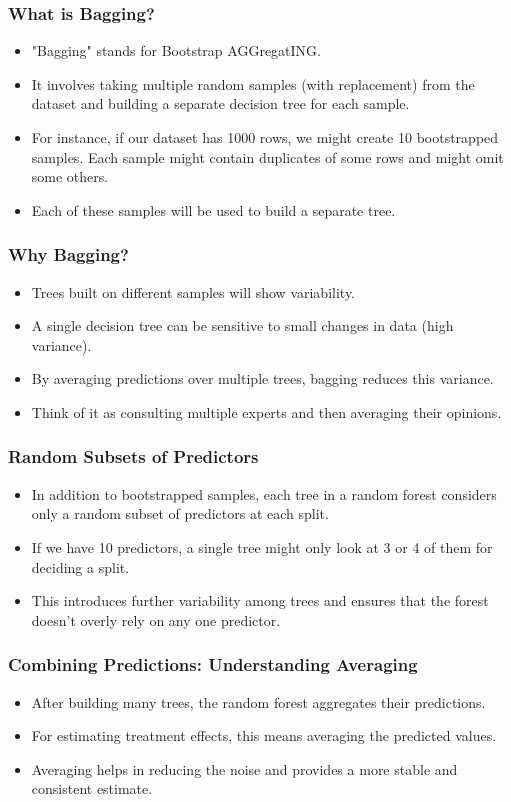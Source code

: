 \documentclass{beamer}
\begin{document}
\begin{frame}
\frametitle{What is Bagging?}
\begin{itemize}
\item "Bagging" stands for Bootstrap AGGregatING.
\item It involves taking multiple random samples (with replacement) from the dataset and building a separate decision tree for each sample.
\item For instance, if our dataset has 1000 rows, we might create 10 bootstrapped samples. Each sample might contain duplicates of some rows and might omit some others.
\item Each of these samples will be used to build a separate tree.
\end{itemize}
\end{frame}

\begin{frame}
\frametitle{Why Bagging?}
\begin{itemize}
\item Trees built on different samples will show variability.
\item A single decision tree can be sensitive to small changes in data (high variance).
\item By averaging predictions over multiple trees, bagging reduces this variance.
\item Think of it as consulting multiple experts and then averaging their opinions.
\end{itemize}
\end{frame}

\begin{frame}
\frametitle{Random Subsets of Predictors}
\begin{itemize}
\item In addition to bootstrapped samples, each tree in a random forest considers only a random subset of predictors at each split.
\item If we have 10 predictors, a single tree might only look at 3 or 4 of them for deciding a split.
\item This introduces further variability among trees and ensures that the forest doesn't overly rely on any one predictor.
\end{itemize}
\end{frame}

\begin{frame}
\frametitle{Combining Predictions: Understanding Averaging}
\begin{itemize}
\item After building many trees, the random forest aggregates their predictions.
\item For estimating treatment effects, this means averaging the predicted values.
\item Averaging helps in reducing the noise and provides a more stable and consistent estimate.
\end{itemize}
\end{frame}
\end{document}
